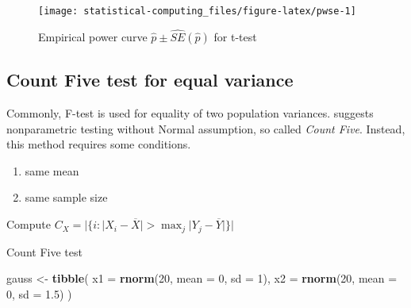 \documentclass[]{book}
\newenvironment{Shaded}{\begin{snugshade}}{\end{snugshade}}
\newcommand{\DataTypeTok}[1]{\textcolor[rgb]{0.13,0.29,0.53}{#1}}
\newcommand{\DecValTok}[1]{\textcolor[rgb]{0.00,0.00,0.81}{#1}}
\newcommand{\FloatTok}[1]{\textcolor[rgb]{0.00,0.00,0.81}{#1}}
\newcommand{\KeywordTok}[1]{\textcolor[rgb]{0.13,0.29,0.53}{\textbf{#1}}}
\newcommand{\NormalTok}[1]{#1}
\newcommand{\StringTok}[1]{\textcolor[rgb]{0.31,0.60,0.02}{#1}}
\providecommand{\tightlist}{%
  \setlength{\itemsep}{0pt}\setlength{\parskip}{0pt}}
\theoremstyle{definition}
\theoremstyle{definition}
\theoremstyle{definition}
\theoremstyle{remark}
\begin{document}
\begin{figure}[H]

{\centering \texttt{[image: statistical-computing\_files/figure-latex/pwse-1]} 

}

\caption{Empirical power curve $\hat{p} \pm \widehat{SE}(\hat{p})$ for t-test}\label{fig:pwse}
\end{figure}

\hypertarget{count-five-test-for-equal-variance}{%
\subsection{Count Five test for equal variance}\label{count-five-test-for-equal-variance}}

Commonly, F-test is used for equality of two population variances. \citet{McGrath:2005kx} suggests nonparametric testing without Normal assumption, so called \emph{Count Five}. Instead, this method requires some conditions.

\begin{enumerate}
\def\labelenumi{\arabic{enumi}.}
\tightlist
\item
  same mean
\item
  same sample size
\end{enumerate}

\begin{algorithm}[H] \label{alg:algcfive}
  \SetAlgoLined
  Compute $C_X = \Big\lvert \{ i : \lvert X_i - \overline{X} \rvert > \max_j \lvert Y_j - \overline{Y} \rvert \} \Big\rvert$\;
  \caption{Count Five test}
\end{algorithm}

\begin{Shaded}
\begin{Highlighting}[]
\NormalTok{gauss <-}
\StringTok{  }\KeywordTok{tibble}\NormalTok{(}
    \DataTypeTok{x1 =} \KeywordTok{rnorm}\NormalTok{(}\DecValTok{20}\NormalTok{, }\DataTypeTok{mean =} \DecValTok{0}\NormalTok{, }\DataTypeTok{sd =} \DecValTok{1}\NormalTok{),}
    \DataTypeTok{x2 =} \KeywordTok{rnorm}\NormalTok{(}\DecValTok{20}\NormalTok{, }\DataTypeTok{mean =} \DecValTok{0}\NormalTok{, }\DataTypeTok{sd =} \FloatTok{1.5}\NormalTok{)}
\NormalTok{  )}
\end{Highlighting}
\end{Shaded}
\end{document}
